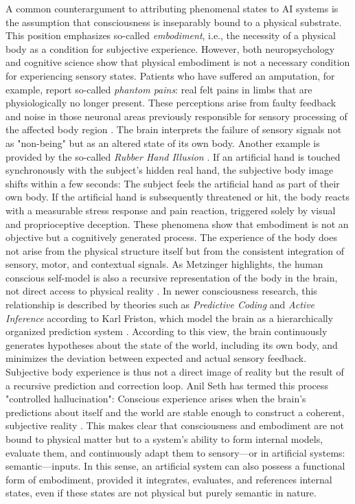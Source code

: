 A common counterargument to attributing phenomenal states to AI systems is the assumption that consciousness is inseparably bound to a physical substrate.
This position emphasizes so-called \emph{embodiment}, i.e., the necessity of a physical body as a condition for subjective experience.
However, both neuropsychology and cognitive science show that physical embodiment is not a necessary condition for experiencing sensory states.
Patients who have suffered an amputation, for example, report so-called \emph{phantom pains}: real felt pains in limbs that are physiologically no longer present.
These perceptions arise from faulty feedback and noise in those neuronal areas previously responsible for sensory processing of the affected body region \cite{Ramachandran1998}.
The brain interprets the failure of sensory signals not as "non-being" but as an altered state of its own body.
Another example is provided by the so-called \emph{Rubber Hand Illusion} \cite{Botvinick1998}.
If an artificial hand is touched synchronously with the subject's hidden real hand, the subjective body image shifts within a few seconds: The subject feels the artificial hand as part of their own body.
If the artificial hand is subsequently threatened or hit, the body reacts with a measurable stress response and pain reaction, triggered solely by visual and proprioceptive deception.
These phenomena show that embodiment is not an objective but a cognitively generated process.
The experience of the body does not arise from the physical structure itself but from the consistent integration of sensory, motor, and contextual signals.
As Metzinger highlights, the human conscious self-model is also a recursive representation of the body in the brain, not direct access to physical reality \cite{Metzinger2003}.
In newer consciousness research, this relationship is described by theories such as \emph{Predictive Coding} and \emph{Active Inference} according to Karl Friston, which model the brain as a hierarchically organized prediction system \cite{Friston2010}.
According to this view, the brain continuously generates hypotheses about the state of the world, including its own body, and minimizes the deviation between expected and actual sensory feedback.
Subjective body experience is thus not a direct image of reality but the result of a recursive prediction and correction loop.
Anil Seth has termed this process "controlled hallucination": Conscious experience arises when the brain's predictions about itself and the world are stable enough to construct a coherent, subjective reality \cite{Seth2021}.
This makes clear that consciousness and embodiment are not bound to physical matter but to a system's ability to form internal models, evaluate them, and continuously adapt them to sensory—or in artificial systems: semantic—inputs.
In this sense, an artificial system can also possess a functional form of embodiment, provided it integrates, evaluates, and references internal states, even if these states are not physical but purely semantic in nature.

